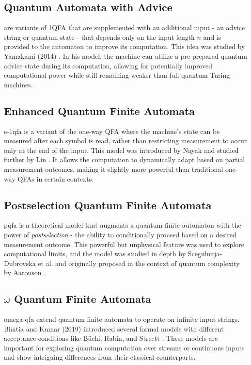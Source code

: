 \subsection{Quantum Automata with Advice} 
 are variants of 1QFA that are supplemented with an additional input - an advice string or quantum state - that depends only on the input length $n$ and is provided to the automaton to improve its computation. This idea was studied by Yamakami (2014) \cite{yamakami2014one}. In his model, the machine can utilize a pre-prepared quantum advice state during its computation, allowing for potentially improved computational power while still remaining weaker than full quantum Turing machines.

\subsection{Enhanced Quantum Finite Automata} 
\gls{e-1qfa} is a variant of the one-way QFA where the machine’s state can be measured after each symbol is read, rather than restricting measurement to occur only at the end of the input. This model was introduced by Nayak \cite{nayak1999optimal} and studied further by Lin \cite{lin2012another}. It allows the computation to dynamically adapt based on partial measurement outcomes, making it slightly more powerful than traditional one-way QFAs in certain contexts.

\subsection{Postselection Quantum Finite Automata} 
\gls{pqfa} is a theoretical model that augments a quantum finite automaton with the power of \emph{postselection} - the ability to conditionally proceed based on a desired measurement outcome. This powerful but unphysical feature was used to explore computational limits, and the model was studied in depth by Scegulnaja-Dubrovska et al. \cite{scegulnaja2010postselection} and originally proposed in the context of quantum complexity by Aaronson \cite{aaronson2005quantum}.

\subsection{\texorpdfstring{$\omega$}{omega} Quantum Finite Automata}
\gls{omega-qfa} extend quantum finite automata to operate on infinite input strings. Bhatia and Kumar (2019) introduced several formal models with different acceptance conditions like Büchi, Rabin, and Streett \cite{bhatia2019quantum}. These models are important for exploring quantum computation over streams or continuous inputs and show intriguing differences from their classical counterparts.


